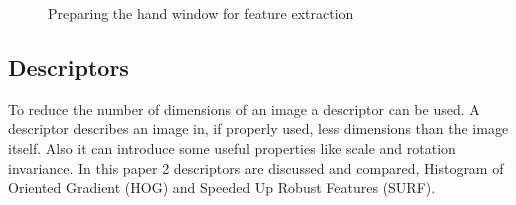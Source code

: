 \begin{figure}[tb]
\begin{center}
\hspace{0.03\linewidth}
\hspace{0.03\linewidth}
\caption{Preparing the hand window for feature extraction}
\label{fig:featureprep}
\end{center}
\end{figure}

\subsection*{Descriptors}
To reduce the number of dimensions of an image a descriptor can be used. A descriptor describes an image in, if properly used, less dimensions than the image itself. Also it can introduce some useful properties like scale and rotation invariance. In this paper 2 descriptors are discussed and compared, Histogram of Oriented Gradient \citep{NavneetDalal2006} (HOG) and Speeded Up Robust Features \citep{Bay2006} (SURF).

